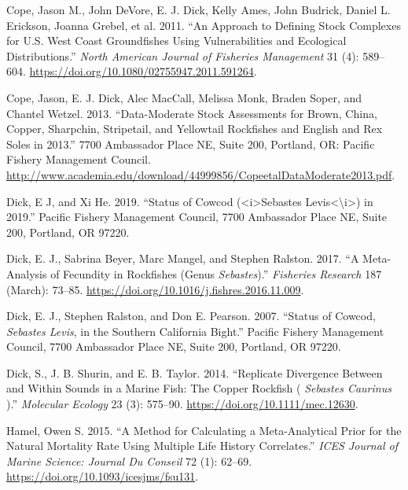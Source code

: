\documentclass[11pt,
  english,
  letterpaper,
]{article}
\newlength{\cslhangindent}
\newenvironment{CSLReferences}[2] %
 {%
  \setlength{\parindent}{0pt}
  \ifodd #1 \everypar{\setlength{\hangindent}{\cslhangindent}}\ignorespaces\fi
  \ifnum #2 > 0
  \setlength{\parskip}{#2\baselineskip}
  \fi
 }%
 {}
\begin{document}
\begin{CSLReferences}{1}{0}
\leavevmode{}%
Cope, Jason M., John DeVore, E. J. Dick, Kelly Ames, John Budrick, Daniel L. Erickson, Joanna Grebel, et al. 2011. {``An {Approach} to {Defining} {Stock} {Complexes} for {U}.{S}. {West} {Coast} {Groundfishes} {Using} {Vulnerabilities} and {Ecological} {Distributions}.''} \emph{North American Journal of Fisheries Management} 31 (4): 589--604. \url{https://doi.org/10.1080/02755947.2011.591264}.

\leavevmode{}%
Cope, Jason, E. J. Dick, Alec MacCall, Melissa Monk, Braden Soper, and Chantel Wetzel. 2013. {``Data-Moderate Stock Assessments for Brown, {China}, Copper, Sharpchin, Stripetail, and Yellowtail Rockfishes and {English} and Rex Soles in 2013.''} 7700 Ambassador Place NE, Suite 200, Portland, OR: Pacific Fishery Management Council. \url{http://www.academia.edu/download/44999856/CopeetalDataModerate2013.pdf}.

\leavevmode{}%
Dick, E J, and Xi He. 2019. {``Status of Cowcod ({\textless{}}i{\textgreater{}}{Sebastes} Levis{\textless{}}{\textbackslash{}}i{\textgreater{}}) in 2019.''} Pacific Fishery Management Council, 7700 Ambassador Place NE, Suite 200, Portland, OR 97220.

\leavevmode{}%
Dick, E. J., Sabrina Beyer, Marc Mangel, and Stephen Ralston. 2017. {``A Meta-Analysis of Fecundity in Rockfishes (Genus \emph{Sebastes}).''} \emph{Fisheries Research} 187 (March): 73--85. \url{https://doi.org/10.1016/j.fishres.2016.11.009}.

\leavevmode{}%
Dick, E. J., Stephen Ralston, and Don E. Pearson. 2007. {``Status of Cowcod, \emph{{Sebastes} Levis}, in the {Southern} {California} {Bight}.''} Pacific Fishery Management Council, 7700 Ambassador Place NE, Suite 200, Portland, OR 97220.

\leavevmode{}%
Dick, S., J. B. Shurin, and E. B. Taylor. 2014. {``Replicate Divergence Between and Within Sounds in a Marine Fish: The Copper Rockfish ( \emph{{Sebastes} Caurinus} ).''} \emph{Molecular Ecology} 23 (3): 575--90. \url{https://doi.org/10.1111/mec.12630}.

\leavevmode{}%
Hamel, Owen S. 2015. {``A Method for Calculating a Meta-Analytical Prior for the Natural Mortality Rate Using Multiple Life History Correlates.''} \emph{ICES Journal of Marine Science: Journal Du Conseil} 72 (1): 62--69. \url{https://doi.org/10.1093/icesjms/fsu131}.


\end{CSLReferences}
\end{document}
